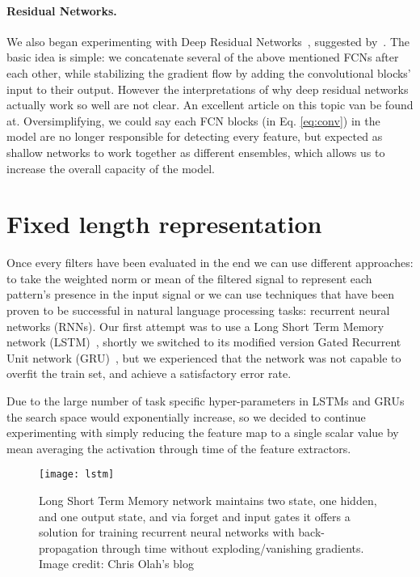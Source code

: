 \paragraph{Residual Networks.}
We also began experimenting with Deep Residual Networks~\cite{he2016deep}, suggested by~\cite{wang2016time}.
The basic idea is simple: we concatenate several of the above mentioned FCNs after each other, while stabilizing the gradient flow by adding the convolutional blocks' input to their output.
However the interpretations of why deep residual networks actually work so well are not clear.
An excellent article on this topic van be found at\cite{veit_residual_2016}.
Oversimplifying, we could say each FCN blocks (in Eq. \ref{eq:conv}) in the model are no longer responsible for detecting every feature, but expected as shallow networks to work together as different ensembles, which allows us to increase the overall capacity of the model.

\section{Fixed length representation}
Once every filters have been evaluated in the end we can use different approaches: to take the weighted norm or mean of the filtered signal to represent each pattern's presence in the input signal or we can use techniques that have been proven to be successful in natural language processing tasks: recurrent neural networks (RNNs).
Our first attempt was to use a Long Short Term Memory network (LSTM)~\cite{hochreiter1997long, malhotra2015long}, shortly we switched to its modified version Gated Recurrent Unit network (GRU)~\cite{chung2014empirical}, but we experienced that the network was not capable to overfit the train set, and achieve a satisfactory error rate.

Due to the large number of task specific hyper-parameters in LSTMs and GRUs the search space would exponentially increase, so we decided to continue experimenting with simply reducing the feature map to a single scalar value by mean averaging the activation through time of the feature extractors.

\begin{figure}
  \centering
  \texttt{[image: lstm]}
  \caption{Long Short Term Memory network maintains two state, one hidden, and one output state, and via forget and input gates it offers a solution for training recurrent neural networks with back-propagation through time without exploding/vanishing gradients. Image credit: Chris Olah's blog~\cite{chris_olah_understanding_nodate}}
  \label{fig:lstm}
\end{figure}

